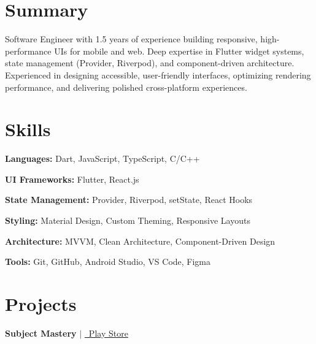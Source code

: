 \documentclass[letterpaper,10pt]{article}
\begin{document}


\section{Summary}
\resumeSubHeadingListStart
\item{}
Software Engineer with 1.5 years of experience building responsive, high-performance UIs for mobile and web. Deep expertise in Flutter widget systems, state management (Provider, Riverpod), and component-driven architecture. Experienced in designing accessible, user-friendly interfaces, optimizing rendering performance, and delivering polished cross-platform experiences.
\resumeSubHeadingListEnd

\section{Skills}
\begin{itemize}[leftmargin=0.15in, label={}, itemsep=0pt]
\small{
\item \textbf{Languages:} Dart, JavaScript, TypeScript, C/C++
\item \textbf{UI Frameworks:} Flutter, React.js
\item \textbf{State Management:} Provider, Riverpod, setState, React Hooks
\item \textbf{Styling:} Material Design, Custom Theming, Responsive Layouts
\item \textbf{Architecture:} MVVM, Clean Architecture, Component-Driven Design
\item \textbf{Tools:} Git, GitHub, Android Studio, VS Code, Figma
}
\end{itemize}



\section{Projects}
\resumeSubHeadingListStart

\resumeProjectHeading
{\textbf{Subject Mastery} $|$ \href{https://play.google.com/store/apps/details?id=com.sanjay_tube.sanjay_ube}{\faAndroid\ Play Store}}{}
\resumeItemListStart
{}
\resumeItemListEnd
\end{document}
